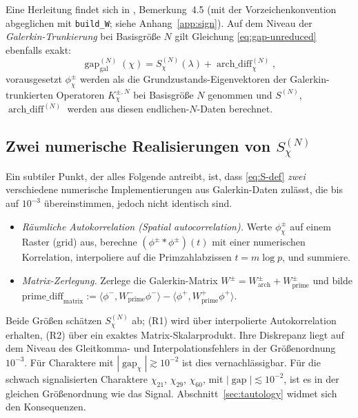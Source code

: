 \documentclass[10pt,twocolumn]{article}
\theoremstyle{definition}
\theoremstyle{remark}
\newcommand{\gap}{\operatorname{gap}}
\newcommand{\chifn}{\chi}
\newcommand{\archdiff}{\operatorname{arch\_diff}}
\begin{document}
Eine Herleitung findet sich in \cite{AnalyticKernel}, Bemerkung~4.5 (mit
der Vorzeichenkonvention abgeglichen mit \texttt{build\_W}; siehe
Anhang~\ref{app:sign}). Auf dem Niveau der \emph{Galerkin-Trunkierung}
bei Basisgröße $N$ gilt Gleichung
\eqref{eq:gap-unreduced} ebenfalls exakt:
\begin{equation}
\label{eq:gap-galerkin}
  \gap_{\mathrm{gal}}^{(N)}(\chifn)
    = S_{\chifn}^{(N)}(\lambda) + \archdiff_{\chifn}^{(N)},
\end{equation}
vorausgesetzt $\phi^\pm_{\chifn}$ werden als die Grundzustands-Eigenvektoren
der Galerkin-trunkierten Operatoren $K_{\chifn}^{\pm, N}$
bei Basisgröße $N$ genommen und $S^{(N)}$, $\archdiff^{(N)}$ werden
aus diesen endlichen-$N$-Daten berechnet.

\subsection{Zwei numerische Realisierungen von \texorpdfstring{$S_{\chifn}^{(N)}$}{S}}
\label{sec:formula-two-realizations}

Ein subtiler Punkt, der alles Folgende antreibt, ist, dass
\eqref{eq:S-def} \emph{zwei} verschiedene numerische
Implementierungen aus Galerkin-Daten zulässt, die bis auf $10^{-3}$ übereinstimmen,
jedoch nicht identisch sind.
\begin{itemize}
  \item[(R1)] \emph{Räumliche Autokorrelation (Spatial autocorrelation).} Werte
    $\phi_{\chifn}^\pm$ auf einem Raster (grid) aus, berechne $(\phi^\pm
    *\phi^\pm)(t)$ mit einer numerischen Korrelation, interpoliere auf
    die Primzahlabzissen $t=m\log p$, und summiere.
  \item[(R2)] \emph{Matrix-Zerlegung.} Zerlege die Galerkin-Matrix
    $W^\pm=W^\pm_{\mathrm{arch}}+W^\pm_{\mathrm{prime}}$ und
    bilde
    $\mathrm{prime\_diff}_{\mathrm{matrix}}
      :=\langle\phi^-,W^-_{\mathrm{prime}}\phi^-\rangle
      -\langle\phi^+,W^+_{\mathrm{prime}}\phi^+\rangle$.
\end{itemize}
Beide Größen schätzen $S_{\chifn}^{(N)}$ ab; (R1) wird über
interpolierte Autokorrelation erhalten, (R2) über ein exaktes Matrix-Skalarprodukt.
Ihre Diskrepanz liegt auf dem Niveau des Gleitkomma- und
Interpolationsfehlers in der Größenordnung $10^{-3}$. Für Charaktere mit
$|\gap_{\chifn}|\gtrsim 10^{-2}$ ist dies vernachlässigbar. Für die schwach
signalisierten Charaktere $\chifn_{21}$, $\chifn_{29}$, $\chifn_{60}$,
mit $|\gap|\lesssim 10^{-2}$, ist es in der gleichen Größenordnung wie das
Signal. Abschnitt~\ref{sec:tautology} widmet sich den Konsequenzen.
\end{document}
